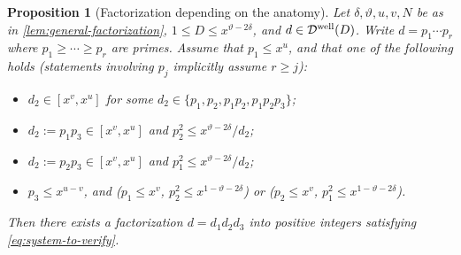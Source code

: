\documentclass[reqno,11pt]{amsart}
\newtheorem{proposition}[theorem]{Proposition}
\theoremstyle{remark}
\numberwithin{equation}{section}
\newcommand{\mDw}{\mathcal{D}^{\textnormal{well}}}
\begin{document}
\begin{proposition}[Factorization depending on the anatomy] \label{prop:fact-anatomy}
Let $\delta, \vartheta, u, v, N$ be as in \cref{lem:general-factorization}, $1 \le D \le x^{\vartheta-2\delta}$, and $d \in \mDw(D)$. Write $d = p_1\cdots p_r$ where $p_1 \ge \cdots \ge p_r$ are primes. Assume that $p_1 \le x^u$, and that one of the following holds (statements involving $p_j$ implicitly assume $r \ge j$):
\begin{itemize}
    \item[$(i).$] $d_2 \in [x^v, x^u]$ for some $d_2 \in \{p_1, p_2, p_1p_2, p_1p_2p_3\}$;
    \item[$(ii).$] $d_2 := p_1p_3 \in [x^v, x^u]$ and $p_2^2 \le x^{\vartheta-2\delta}/d_2$;
    \item[$(iii).$] $d_2 := p_2p_3 \in [x^v, x^u]$ and $p_1^2 \le x^{\vartheta-2\delta}/d_2$;
    \item[$(iv).$] $p_3 \le x^{u-v}$, and ($p_1 \le x^v$, $p_2^2 \le x^{1-\vartheta-2\delta}$) or ($p_2 \le x^v$, $p_1^2 \le x^{1-\vartheta-2\delta}$).
\end{itemize}
Then there exists a factorization $d = d_1d_2d_3$ into positive integers satisfying \cref{eq:system-to-verify}.
\end{proposition}
\end{document}
